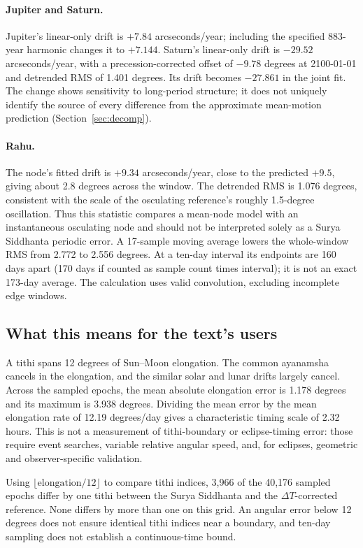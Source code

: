 \documentclass[11pt,a4paper]{article}
\newcommand{\dT}{$\Delta T$}
\begin{document}
\paragraph{Jupiter and Saturn.} Jupiter's linear-only drift is $+7.84$ arcseconds/year; including the specified 883-year harmonic changes it to $+7.144$. Saturn's linear-only drift is $-29.52$ arcseconds/year, with a precession-corrected offset of $-9.78$ degrees at 2100-01-01 and detrended RMS of 1.401 degrees. Its drift becomes $-27.861$ in the joint fit. The change shows sensitivity to long-period structure; it does not uniquely identify the source of every difference from the approximate mean-motion prediction (Section~\ref{sec:decomp}).

\paragraph{Rahu.} The node's fitted drift is $+9.34$ arcseconds/year, close to the predicted $+9.5$, giving about 2.8 degrees across the window. The detrended RMS is 1.076 degrees, consistent with the scale of the osculating reference's roughly 1.5-degree oscillation. Thus this statistic compares a mean-node model with an instantaneous osculating node and should not be interpreted solely as a Surya Siddhanta periodic error. A 17-sample moving average lowers the whole-window RMS from 2.772 to 2.556 degrees. At a ten-day interval its endpoints are 160 days apart (170 days if counted as sample count times interval); it is not an exact 173-day average. The calculation uses valid convolution, excluding incomplete edge windows.

\subsection{What this means for the text's users}

A tithi spans 12 degrees of Sun--Moon elongation. The common ayanamsha cancels in the elongation, and the similar solar and lunar drifts largely cancel. Across the sampled epochs, the mean absolute elongation error is 1.178 degrees and its maximum is 3.938 degrees. Dividing the mean error by the mean elongation rate of 12.19 degrees/day gives a characteristic timing scale of 2.32 hours. This is not a measurement of tithi-boundary or eclipse-timing error: those require event searches, variable relative angular speed, and, for eclipses, geometric and observer-specific validation.

Using $\lfloor \text{elongation}/12 \rfloor$ to compare tithi indices, 3,966 of the 40,176 sampled epochs differ by one tithi between the Surya Siddhanta and the \dT{}-corrected reference. None differs by more than one on this grid. An angular error below 12 degrees does not ensure identical tithi indices near a boundary, and ten-day sampling does not establish a continuous-time bound.
\end{document}
